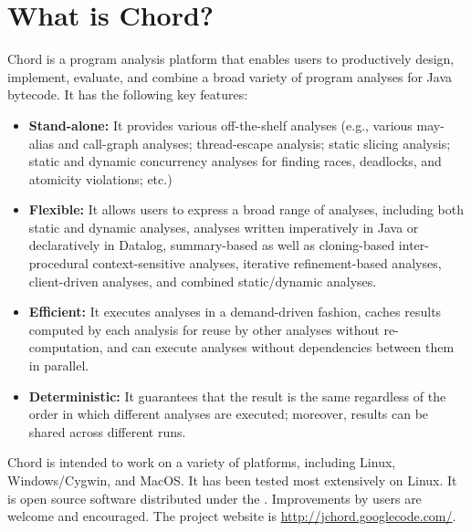 \chapter{What is Chord?}
\label{chap:whatis-chord}

Chord is a program analysis platform that enables users to
productively design, implement, evaluate, and combine a
broad variety of program analyses for Java bytecode. It has the
following key features:

\begin{itemize}
\item

{\bf Stand-alone:} It provides various off-the-shelf analyses (e.g., various
may-alias and call-graph analyses; thread-escape analysis;
static slicing analysis; static and dynamic concurrency analyses for finding
races, deadlocks, and atomicity violations; etc.)

\item

{\bf Flexible:} It allows users to express a broad range of analyses,
including both static and dynamic analyses, analyses written
imperatively in Java or declaratively in Datalog, summary-based as
well as cloning-based inter-procedural context-sensitive analyses,
iterative refinement-based analyses, client-driven analyses, and
combined static/dynamic analyses.

\item

{\bf Efficient:} It executes analyses in a demand-driven fashion, caches
results computed by each analysis for reuse by other analyses without
re-computation, and can execute analyses without dependencies between
them in parallel.

\item

{\bf Deterministic:} It guarantees that the result is the same regardless of
the order in which different analyses are executed; moreover, results
can be shared across different runs.
\end{itemize}

Chord is intended to work on a variety of platforms,
including Linux, Windows/Cygwin, and MacOS.  It has been tested most
extensively on Linux.  It is open source software distributed under
the .
Improvements by users are welcome and encouraged.  The project website
is \url{http://jchord.googlecode.com/}.


